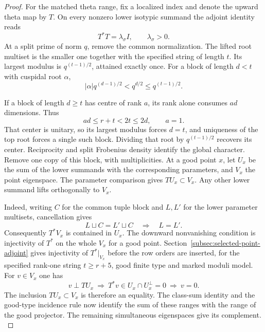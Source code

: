 \begin{proof}
For the matched theta range, fix a localized index and denote the
upward theta map by \(T\). On every nonzero lower isotypic summand the adjoint identity reads
\[
             T^*T=\lambda_\sigma I,\qquad \lambda_\sigma>0.
\]
At a split prime of norm \(q\), remove the common normalization.
The lifted root multiset is the smaller one together with the
specified string of length \(t\). Its largest modulus is
\(q^{(t-1)/2}\), attained exactly once. For a block of length \(d<t\)
with cuspidal root \(\alpha\),
\[
 |\alpha|q^{(d-1)/2}<q^{d/2}\le q^{(t-1)/2}.
\]

If a block of length \(d\ge t\) has centre of rank \(a\), its rank
alone consumes \(ad\) dimensions. Thus
\[
                ad\le r+t<2t\le2d,\qquad a=1 .
\] That center is unitary, so its largest modulus forces
\(d=t\), and uniqueness of the top root forces a single such
block. Dividing that root by \(q^{(t-1)/2}\) recovers its center.
Reciprocity and split Frobenius density identify the global
character. Remove one copy of this block, with multiplicities.
At a good point \(x\),
let \(U_x\) be the sum of the lower summands with the corresponding
parameters, and \(V_x\) the point eigenspace. The parameter
comparison gives \(TU_x\subset V_x\). Any other lower summand lifts orthogonally to \(V_x\).

Indeed, writing \(C\) for the common tuple block and \(L,L'\) for the lower parameter multisets, cancellation gives
\[
 L\sqcup C=L'\sqcup C\quad\Longrightarrow\quad L=L' .
\] Consequently \(T^*V_x\)
is contained in \(U_x\). The downward nonvanishing condition
is injectivity of \(T^*\) on the whole \(V_x\) for a good point.
Section~\ref{subsec:selected-point-adjoint} gives injectivity of
\(T^*|_{V_x}\) before the row orders are inserted, for the specified
rank-one string \(t\ge r+5\), good finite type and marked moduli
model. For \(v\in V_x\) one has
\[
 v\perp TU_x\ \Longrightarrow\
 T^*v\in U_x\cap U_x^\perp=0\ \Longrightarrow\ v=0.
\]
The inclusion \(TU_x\subset V_x\) is therefore an equality.
The class-sum identity and the good-type incidence rule now
identify the sum of these ranges with the range of the good
projector. The remaining simultaneous eigenspaces give its
complement. \label{cor:automorphic-realization-41}


\end{proof}
